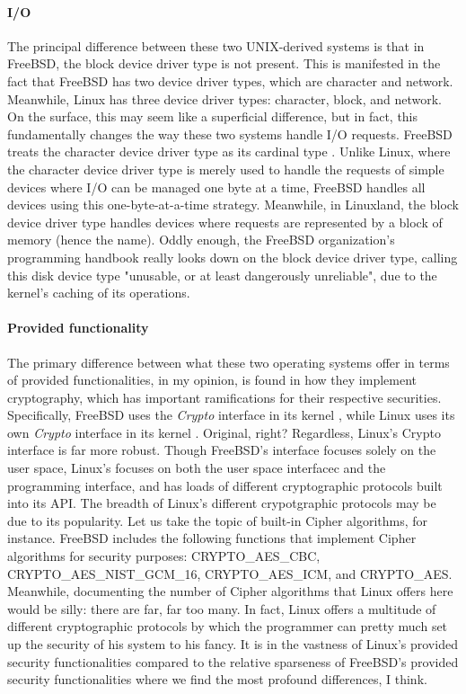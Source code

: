 \documentclass[letterpaper,10pt,titlepage]{article}
\begin{document}
\paragraph{I/O}
The principal difference between these two UNIX-derived systems is that in FreeBSD, the block device driver type is not present. This is manifested in the fact that FreeBSD has two device driver types, which are character and network. Meanwhile, Linux has three device driver types: character, block, and network. On the surface, this may seem like a superficial difference, but in fact, this fundamentally changes the way these two systems handle I/O requests. FreeBSD treats the character device driver type as its cardinal type \cite{freeBSD2}. Unlike Linux, where the character device driver type is merely used to handle the requests of simple devices where I/O can be managed one byte at a time, FreeBSD handles all devices using this one-byte-at-a-time strategy. Meanwhile, in Linuxland, the block device driver type handles devices where requests are represented by a block of memory (hence the name). Oddly enough, the FreeBSD organization's programming handbook really looks down on the block device driver type, calling this disk device type "unusable, or at least dangerously unreliable", due to the kernel's caching of its operations.  

\paragraph{Provided functionality}
The primary difference between what these two operating systems offer in terms of provided functionalities, in my opinion, is found in how they implement cryptography, which has important ramifications for their respective securities. Specifically, FreeBSD uses the \emph{Crypto} interface in its kernel \cite{freeBSD2}, while Linux uses its own \emph{Crypto} interface in its kernel \cite{linux}. Original, right? Regardless, Linux's Crypto interface is far more robust. Though FreeBSD's interface focuses solely on the user space, Linux's focuses on both the user space interfacec and the programming interface, and has loads of different cryptographic protocols built into its API. The breadth of Linux's different crypotgraphic protocols may be due to its popularity. Let us take the topic of built-in Cipher algorithms, for instance. FreeBSD includes the following functions that implement Cipher algorithms for security purposes: CRYPTO\_AES\_CBC, CRYPTO\_AES\_NIST\_GCM\_16, CRYPTO\_AES\_ICM, and CRYPTO\_AES. Meanwhile, documenting the number of Cipher algorithms that Linux offers here would be silly: there are far, far too many. In fact, Linux offers a multitude of different cryptographic protocols by which the programmer can pretty much set up the security of his system to his fancy. It is in the vastness of Linux's provided security functionalities compared to the relative sparseness of FreeBSD's provided security functionalities where we find the most profound differences, I think. 
\end{document}
